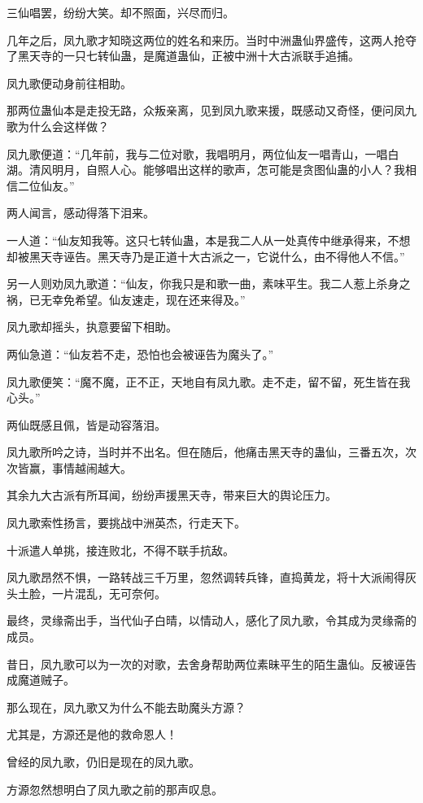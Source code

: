 \begin{this_body}
三仙唱罢，纷纷大笑。却不照面，兴尽而归。

几年之后，凤九歌才知晓这两位的姓名和来历。当时中洲蛊仙界盛传，这两人抢夺了黑天寺的一只七转仙蛊，是魔道蛊仙，正被中洲十大古派联手追捕。

凤九歌便动身前往相助。

那两位蛊仙本是走投无路，众叛亲离，见到凤九歌来援，既感动又奇怪，便问凤九歌为什么会这样做？

凤九歌便道：“几年前，我与二位对歌，我唱明月，两位仙友一唱青山，一唱白湖。清风明月，自照人心。能够唱出这样的歌声，怎可能是贪图仙蛊的小人？我相信二位仙友。”

两人闻言，感动得落下泪来。

一人道：“仙友知我等。这只七转仙蛊，本是我二人从一处真传中继承得来，不想却被黑天寺诬告。黑天寺乃是正道十大古派之一，它说什么，由不得他人不信。”

另一人则劝凤九歌道：“仙友，你我只是和歌一曲，素味平生。我二人惹上杀身之祸，已无幸免希望。仙友速走，现在还来得及。”

凤九歌却摇头，执意要留下相助。

两仙急道：“仙友若不走，恐怕也会被诬告为魔头了。”

凤九歌便笑：“魔不魔，正不正，天地自有凤九歌。走不走，留不留，死生皆在我心头。”

两仙既感且佩，皆是动容落泪。

凤九歌所吟之诗，当时并不出名。但在随后，他痛击黑天寺的蛊仙，三番五次，次次皆赢，事情越闹越大。

其余九大古派有所耳闻，纷纷声援黑天寺，带来巨大的舆论压力。

凤九歌索性扬言，要挑战中洲英杰，行走天下。

十派遣人单挑，接连败北，不得不联手抗敌。

凤九歌昂然不惧，一路转战三千万里，忽然调转兵锋，直捣黄龙，将十大派闹得灰头土脸，一片混乱，无可奈何。

最终，灵缘斋出手，当代仙子白晴，以情动人，感化了凤九歌，令其成为灵缘斋的成员。

昔日，凤九歌可以为一次的对歌，去舍身帮助两位素昧平生的陌生蛊仙。反被诬告成魔道贼子。

那么现在，凤九歌又为什么不能去助魔头方源？

尤其是，方源还是他的救命恩人！

曾经的凤九歌，仍旧是现在的凤九歌。

方源忽然想明白了凤九歌之前的那声叹息。


\end{this_body}
